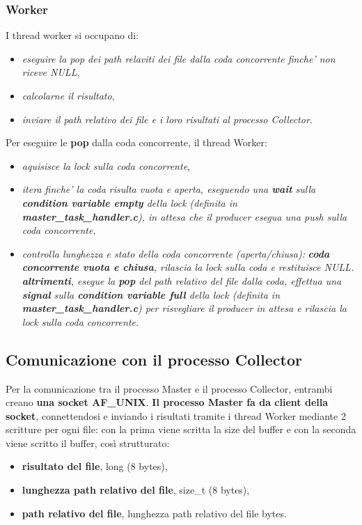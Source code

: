 \documentclass{article}
\begin{document}
\subsubsection{Worker}
I thread worker si occupano di:
\begin{itemize}
    \itemsep 0em
    \item \textit{eseguire la pop dei path relaviti dei file dalla coda concorrente finche' non riceve NULL},
    \item \textit{calcolarne il risultato},
    \item \textit{inviare il path relativo dei file e i loro risultati al processo Collector}.
\end{itemize}
Per eseguire le \textbf{pop} dalla coda concorrente, il thread Worker:
\begin{itemize}
    \itemsep 0em
    \item \textit{aquisisce la lock sulla coda concorrente},
    \item \textit{itera finche' la coda risulta vuota e aperta, eseguendo una \textbf{wait} sulla \textbf{condition variable empty} della lock (definita in \textbf{\textit{master\_task\_handler.c}}), in attesa che il producer esegua una push sulla coda concorrente},
    \item \textit{controlla lunghezza e stato della coda concorrente (aperta/chiusa):}
          \subitem \textit{\textbf{coda concorrente vuota e chiusa}, rilascia la lock sulla coda e restituisce NULL.}
          \subitem \textit{\textbf{altrimenti}, esegue la \textbf{pop} del path relativo del file dalla coda, effettua una \textbf{signal} sulla \textbf{condition variable full} della lock (definita in \textbf{\textit{master\_task\_handler.c}}) per risvegliare il producer in attesa e rilascia la lock sulla coda concorrente.}
\end{itemize}

\subsection{Comunicazione con il processo Collector}
Per la comunicazione tra il processo Master e il processo Collector, entrambi creano \textbf{una socket AF\_UNIX}.\newline\newline
\textbf{Il processo Master fa da client della socket}, connettendosi e inviando i risultati tramite i thread Worker mediante 2 scritture per ogni file: con la prima viene scritta la size del buffer e con la seconda viene scritto il buffer, così strutturato:
\begin{itemize}
    \itemsep 0em
    \item \textbf{risultato del file}, long (8 bytes),
    \item \textbf{lunghezza path relativo del file}, size\_t (8 bytes),
    \item \textbf{path relativo del file}, lunghezza path relativo del file bytes.
\end{itemize}
\end{document}

